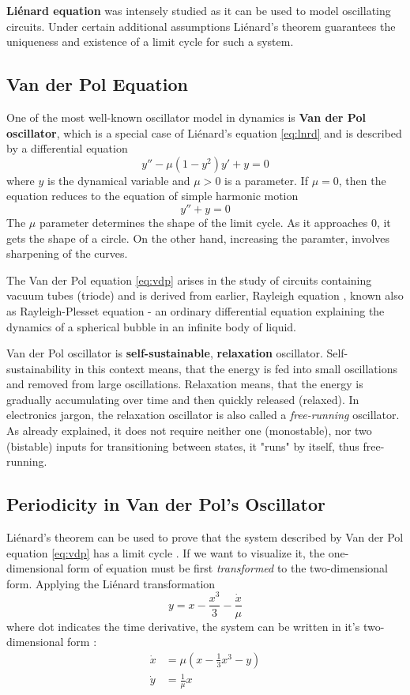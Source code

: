 \documentclass[journal]{IEEEtran}
\begin{document}
\textbf{Li\'{e}nard equation} was intensely studied as it can be used to model oscillating circuits. Under certain additional assumptions Li\'{e}nard's theorem guarantees the uniqueness and existence of a limit cycle for such a system.

\subsection{Van der Pol Equation}
One of the most well-known oscillator model in dynamics is \textbf{Van der Pol oscillator}, which is a special case of Li\'{e}nard's equation \eqref{eq:lnrd} and is described by a differential equation
\begin{equation}
\label{eq:vdp}
y''-\mu\left(1-y^2\right)y'+y=0
\end{equation}
where $y$ is the dynamical variable and $\mu>0$ is a parameter. If $\mu=0$, then the equation reduces to the equation of simple harmonic motion
$$y''+y=0$$
The $\mu$ parameter determines the shape of the limit cycle. As it approaches 0, it gets the shape of a circle. On the other hand, increasing the paramter, involves sharpening of the curves.

The Van der Pol equation \eqref{eq:vdp} arises in the study of circuits containing vacuum tubes (triode) and is derived from earlier, Rayleigh equation \cite{nahin2001science}, known also as Rayleigh-Plesset equation - an ordinary differential equation explaining the dynamics of a spherical bubble in an infinite body of liquid.

Van der Pol oscillator is \textbf{self-sustainable}, \textbf{relaxation} oscillator. Self-sustainability in this context means, that the energy is fed into small oscillations and removed from large oscillations. Relaxation means, that the energy is gradually accumulating over time and then quickly released (relaxed). In electronics jargon, the relaxation oscillator is also called a \textit{free-running} oscillator. As already explained, it does not require neither one (monostable), nor two (bistable) inputs for transitioning between states, it "runs" by itself, thus free-running.

\subsection{Periodicity in Van der Pol's Oscillator}
Li\'{e}nard's theorem can be used to prove that the system described by  Van der Pol equation \eqref{eq:vdp} has a limit cycle \cite{sternberg2014dynamical}. If we want to visualize it, the one-dimensional form of equation must be first \textit{transformed} to the two-dimensional form. Applying the Li\'{e}nard transformation $$y=x-\frac{x^3}{3}-\frac{\dot x}{\mu}$$ where dot indicates the time derivative, the system can be written in it's two-dimensional form \cite{kaplan2012understanding}:
\begin{align*}
\dot x &= \mu \left(x-\frac13 x^3 -y\right) \\
\dot y &= \frac{1}{\mu} x
\end{align*}
\end{document}
